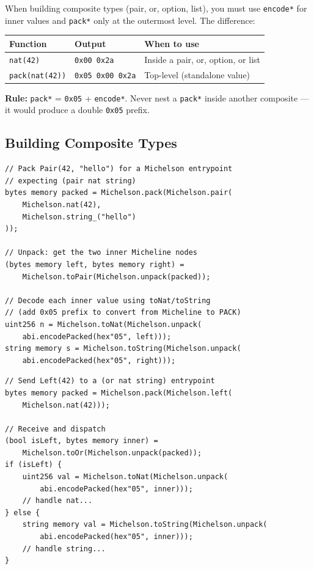 \documentclass[11pt,a4paper]{article}
\begin{document}
When building composite types (pair, or, option, list), you must use
\texttt{encode*} for inner values and \texttt{pack*} only at the outermost
level. The difference:

\begin{center}
\begin{tabular}{@{}lll@{}}
\toprule
\textbf{Function} & \textbf{Output} & \textbf{When to use} \\
\midrule
\texttt{nat(42)} & \texttt{0x00 0x2a} & Inside a pair, or, option, or list \\
\texttt{pack(nat(42))} & \texttt{0x05 0x00 0x2a} & Top-level (standalone value) \\
\bottomrule
\end{tabular}
\end{center}

\textbf{Rule:} \texttt{pack*} = \texttt{0x05} + \texttt{encode*}. Never nest a
\texttt{pack*} inside another composite --- it would produce a double
\texttt{0x05} prefix.

\subsection{Building Composite Types}

\begin{codebox}
\begin{lstlisting}[language=Solidity]
// Pack Pair(42, "hello") for a Michelson entrypoint
// expecting (pair nat string)
bytes memory packed = Michelson.pack(Michelson.pair(
    Michelson.nat(42),
    Michelson.string_("hello")
));

// Unpack: get the two inner Micheline nodes
(bytes memory left, bytes memory right) =
    Michelson.toPair(Michelson.unpack(packed));

// Decode each inner value using toNat/toString
// (add 0x05 prefix to convert from Micheline to PACK)
uint256 n = Michelson.toNat(Michelson.unpack(
    abi.encodePacked(hex"05", left)));
string memory s = Michelson.toString(Michelson.unpack(
    abi.encodePacked(hex"05", right)));
\end{lstlisting}
\end{codebox}

\begin{codebox}
\begin{lstlisting}[language=Solidity]
// Send Left(42) to a (or nat string) entrypoint
bytes memory packed = Michelson.pack(Michelson.left(
    Michelson.nat(42)));

// Receive and dispatch
(bool isLeft, bytes memory inner) =
    Michelson.toOr(Michelson.unpack(packed));
if (isLeft) {
    uint256 val = Michelson.toNat(Michelson.unpack(
        abi.encodePacked(hex"05", inner)));
    // handle nat...
} else {
    string memory val = Michelson.toString(Michelson.unpack(
        abi.encodePacked(hex"05", inner)));
    // handle string...
}
\end{lstlisting}
\end{codebox}
\end{document}
